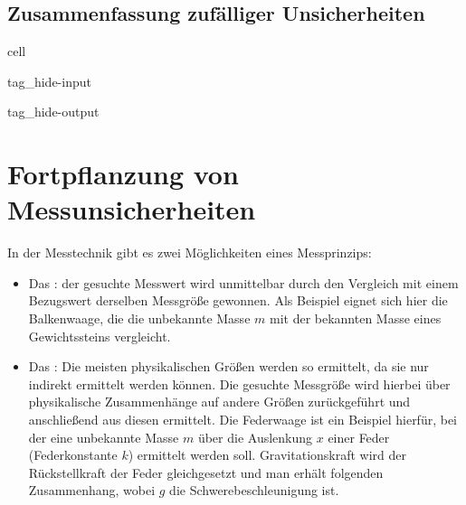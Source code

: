 \documentclass[letterpaper,10pt,english]{jupyterBook}
\begin{document}
\subsection{Zusammenfassung zufälliger Unsicherheiten}
\label{\detokenize{content/1_Mittelwert_StdAbw:zusammenfassung-zufalliger-unsicherheiten}}
\sphinxAtStartPar
{}

\sphinxstepscope

\begin{sphinxuseclass}{cell}
\begin{sphinxuseclass}{tag_hide-input}
\begin{sphinxuseclass}{tag_hide-output}
\end{sphinxuseclass}
\end{sphinxuseclass}
\end{sphinxuseclass}

\section{Fortpflanzung von Messunsicherheiten}
\label{\detokenize{content/1_Fehlerfortpflanzung:fortpflanzung-von-messunsicherheiten}}\label{\detokenize{content/1_Fehlerfortpflanzung::doc}}
\sphinxAtStartPar
In der Messtechnik gibt es zwei Möglichkeiten eines Messprinzips:
\begin{itemize}
\item {} 
\sphinxAtStartPar
Das : der gesuchte Messwert wird unmittelbar durch den Vergleich mit einem Bezugswert derselben Messgröße gewonnen. Als Beispiel eignet sich hier die Balkenwaage, die die unbekannte Masse \(m\) mit der bekannten Masse eines Gewichtssteins vergleicht.

\item {} 
\sphinxAtStartPar
Das : Die meisten physikalischen Größen werden so ermittelt, da sie nur indirekt ermittelt werden können. Die gesuchte Messgröße wird hierbei über physikalische Zusammenhänge auf andere Größen zurückgeführt und anschließend aus diesen ermittelt. Die Federwaage ist ein Beispiel hierfür, bei der eine unbekannte Masse \(m\) über die Auslenkung \(x\) einer Feder (Federkonstante \(k\)) ermittelt werden soll. Gravitationskraft wird der Rückstellkraft der Feder gleichgesetzt und man erhält folgenden Zusammenhang, wobei \(g\) die Schwerebeschleunigung ist.

\end{itemize}
\end{document}
